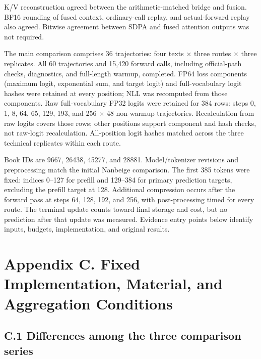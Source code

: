 \documentclass[10pt,a4paper]{article}
\begin{document}
K/V reconstruction agreed between the arithmetic-matched bridge and fusion. BF16 rounding of fused context, ordinary-call replay, and actual-forward replay also agreed. Bitwise agreement between SDPA and fused attention outputs was not required.

The main comparison comprises 36 trajectories: four texts × three routes × three replicates. All 60 trajectories and 15,420 forward calls, including official-path checks, diagnostics, and full-length warmup, completed. FP64 loss components (maximum logit, exponential sum, and target logit) and full-vocabulary logit hashes were retained at every position; NLL was recomputed from those components. Raw full-vocabulary FP32 logits were retained for 384 rows: steps 0, 1, 8, 64, 65, 129, 193, and 256 × 48 non-warmup trajectories. Recalculation from raw logits covers those rows; other positions support component and hash checks, not raw-logit recalculation. All-position logit hashes matched across the three technical replicates within each route.

Book IDs are 9667, 26438, 45277, and 28881. Model/tokenizer revisions and preprocessing match the initial Nanbeige comparison. The first 385 tokens were fixed: indices 0--127 for prefill and 129--384 for primary prediction targets, excluding the prefill target at 128. Additional compression occurs after the forward pass at steps 64, 128, 192, and 256, with post-processing timed for every route. The terminal update counts toward final storage and cost, but no prediction after that update was measured. Evidence entry points below identify inputs, budgets, implementation, and original results.

\section{Appendix C. Fixed Implementation, Material, and Aggregation Conditions}\label{appendix-c.-fixed-implementation-material-and-aggregation-conditions}

\subsection{C.1 Differences among the three comparison series}\label{c.1-differences-among-the-three-comparison-series}
\end{document}
